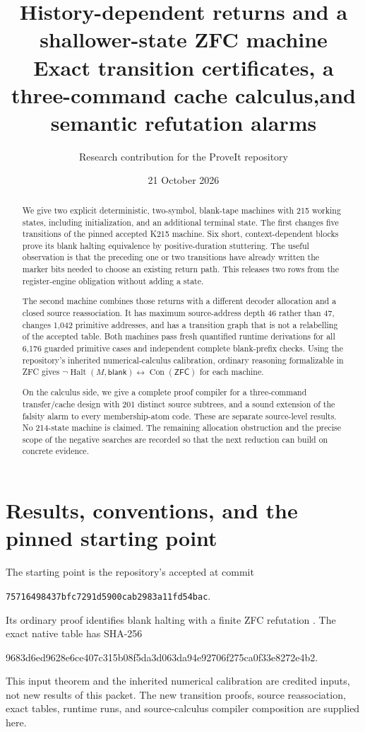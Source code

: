 \documentclass[11pt]{article}
\title{History-dependent returns and a shallower\newline 215-state ZFC machine\\[4pt]
\large Exact transition certificates, a three-command cache calculus,\newline and semantic refutation alarms}
\author{Research contribution for the ProveIt repository}
\date{21 October 2026}
\theoremstyle{definition}
\newcommand{\ZFC}{\mathsf{ZFC}}
\newcommand{\Con}{\operatorname{Con}}
\newcommand{\Halt}{\operatorname{Halt}}
\newcommand{\blank}{\mathsf{blank}}
\newcommand{\pin}{\texttt{75716498437bfc7291d5900cab2983a11fd54bac}}
\begin{document}
\maketitle
\begin{abstract}
We give two explicit deterministic, two-symbol, blank-tape machines with
215 working states, including initialization, and an additional terminal
state. The first changes five transitions of the pinned accepted K215
machine. Six short, context-dependent blocks prove its blank halting
equivalence by positive-duration stuttering. The useful observation is that
the preceding one or two transitions have already written the marker bits
needed to choose an existing return path. This releases two rows from the
register-engine obligation without adding a state.

The second machine combines those returns with a different decoder
allocation and a closed source reassociation. It has maximum source-address
depth 46 rather than 47, changes 1,042 primitive addresses, and has a
transition graph that is not a relabelling of the accepted table. Both
machines pass fresh quantified runtime derivations for all 6,176 guarded
primitive cases and independent complete blank-prefix checks. Using the
repository's inherited numerical-calculus calibration, ordinary reasoning
formalizable in ZFC gives
\(\neg\Halt(M,\blank)\leftrightarrow\Con(\ZFC)\) for each machine.

On the calculus side, we give a complete proof compiler for a three-command
transfer/cache design with 201 distinct source subtrees, and a sound
extension of the falsity alarm to every membership-atom code. These are
separate source-level results. No 214-state machine is claimed. The
remaining allocation obstruction and the precise scope of the negative
searches are recorded so that the next reduction can build on concrete
evidence.
\end{abstract}
\newpage
\tableofcontents
\newpage

\section{Results, conventions, and the pinned starting point}

The starting point is the repository's accepted
 at commit
\begin{center}\small\pin.\end{center}
Its ordinary proof identifies blank halting with a finite ZFC refutation
\cite{k215}. The exact native table has SHA-256
\begin{center}\footnotesize\ttfamily
9683d6ed9628e6ce407c315b08f5da3d063da94e92706f275ca0f33e8272e4b2.
\end{center}
This input theorem and the inherited numerical calibration are credited
inputs, not new results of this packet. The new transition proofs, source
reassociation, exact tables, runtime runs, and source-calculus compiler
composition are supplied here.
\end{document}

